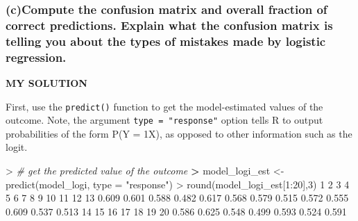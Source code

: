 \documentclass[
]{article}
\newenvironment{Shaded}{\begin{snugshade}}{\end{snugshade}}
\newcommand{\AttributeTok}[1]{\textcolor[rgb]{0.77,0.63,0.00}{#1}}
\newcommand{\CommentTok}[1]{\textcolor[rgb]{0.56,0.35,0.01}{\textit{#1}}}
\newcommand{\DecValTok}[1]{\textcolor[rgb]{0.00,0.00,0.81}{#1}}
\newcommand{\ErrorTok}[1]{\textcolor[rgb]{0.64,0.00,0.00}{\textbf{#1}}}
\newcommand{\FloatTok}[1]{\textcolor[rgb]{0.00,0.00,0.81}{#1}}
\newcommand{\FunctionTok}[1]{\textcolor[rgb]{0.00,0.00,0.00}{#1}}
\newcommand{\NormalTok}[1]{#1}
\newcommand{\OtherTok}[1]{\textcolor[rgb]{0.56,0.35,0.01}{#1}}
\newcommand{\SpecialCharTok}[1]{\textcolor[rgb]{0.00,0.00,0.00}{#1}}
\newcommand{\StringTok}[1]{\textcolor[rgb]{0.31,0.60,0.02}{#1}}
\begin{document}
\hypertarget{ccompute-the-confusion-matrix-and-overall-fraction-of-correct-predictions.-explain-what-the-confusion-matrix-is-telling-you-about-the-types-of-mistakes-made-by-logistic-regression.}{%
\subsubsection{\texorpdfstring{\textbf{(c)Compute the confusion matrix
and overall fraction of correct predictions. Explain what the confusion
matrix is telling you about the types of mistakes made by logistic
regression.}}{(c)Compute the confusion matrix and overall fraction of correct predictions. Explain what the confusion matrix is telling you about the types of mistakes made by logistic regression.}}\label{ccompute-the-confusion-matrix-and-overall-fraction-of-correct-predictions.-explain-what-the-confusion-matrix-is-telling-you-about-the-types-of-mistakes-made-by-logistic-regression.}}

\textbf{MY SOLUTION}

First, use the \texttt{predict()} function to get the model-estimated
values of the outcome. Note, the argument \texttt{type\ =\ "response"}
option tells R to output probabilities of the form P(Y = 1\textbar X),
as opposed to other information such as the logit.

\begin{Shaded}
\begin{Highlighting}[]
\SpecialCharTok{\textgreater{}} \CommentTok{\# get the predicted value of the outcome}
\ErrorTok{\textgreater{}}\NormalTok{ model\_logi\_est }\OtherTok{\textless{}{-}} \FunctionTok{predict}\NormalTok{(model\_logi, }\AttributeTok{type =} \StringTok{"response"}\NormalTok{)}
\SpecialCharTok{\textgreater{}} \FunctionTok{round}\NormalTok{(model\_logi\_est[}\DecValTok{1}\SpecialCharTok{:}\DecValTok{20}\NormalTok{],}\DecValTok{3}\NormalTok{)}
    \DecValTok{1}     \DecValTok{2}     \DecValTok{3}     \DecValTok{4}     \DecValTok{5}     \DecValTok{6}     \DecValTok{7}     \DecValTok{8}     \DecValTok{9}    \DecValTok{10}    \DecValTok{11}    \DecValTok{12}    \DecValTok{13} 
\FloatTok{0.609} \FloatTok{0.601} \FloatTok{0.588} \FloatTok{0.482} \FloatTok{0.617} \FloatTok{0.568} \FloatTok{0.579} \FloatTok{0.515} \FloatTok{0.572} \FloatTok{0.555} \FloatTok{0.609} \FloatTok{0.537} \FloatTok{0.513} 
   \DecValTok{14}    \DecValTok{15}    \DecValTok{16}    \DecValTok{17}    \DecValTok{18}    \DecValTok{19}    \DecValTok{20} 
\FloatTok{0.586} \FloatTok{0.625} \FloatTok{0.548} \FloatTok{0.499} \FloatTok{0.593} \FloatTok{0.524} \FloatTok{0.591} 
\end{Highlighting}
\end{Shaded}
\end{document}
